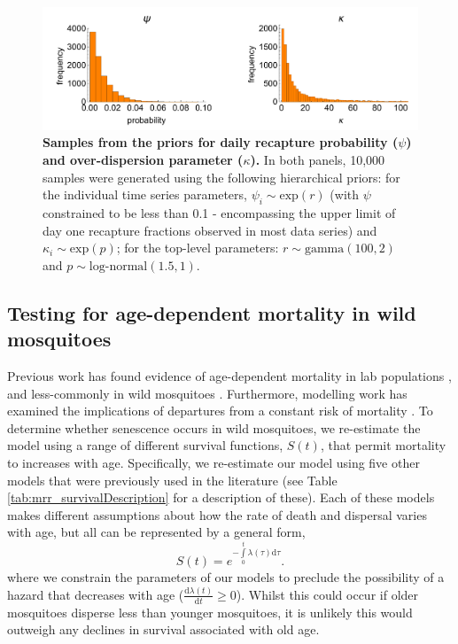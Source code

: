\documentclass[12pt]{article}
\begin{document}
\begin{figure}[h]
	\centerline{\includegraphics[width=1\textwidth]{./Figure_files/mrr_priors_PsiKappa.pdf}}
	\caption{\textbf{Samples from the priors for daily recapture probability ($\psi$) and over-dispersion parameter ($\kappa$).} In both panels, 10,000 samples were generated using the following hierarchical priors: for the individual time series parameters, $\psi_i \sim \text{exp}(r)$ (with $\psi$ constrained to be less than 0.1 - encompassing the upper limit of day one recapture fractions observed in most data series) and $\kappa_i \sim \text{exp}(p)$; for the top-level parameters: $r\sim \text{gamma}(100, 2)$ and $p\sim \text{log-normal}(1.5, 1)$.}\label{fig:mrr_PsiKappaPriors}
\end{figure}

\subsection{Testing for age-dependent mortality in wild mosquitoes}\label{sec:mrr_age_dependence}
Previous work has found evidence of age-dependent mortality in lab populations \citep{styer2007mosquitoes,dawes2009anopheles}, and less-commonly in wild mosquitoes \citep{clements1981analysis,harrington2008age}. Furthermore, modelling work has examined the implications of departures from a constant risk of mortality \citep{styer2007mosquitoes,hancock2009age,novoseltsev2012age}. To determine whether senescence occurs in wild mosquitoes, we re-estimate the model using a range of different survival functions, $S(t)$, that permit mortality to increases with age. Specifically, we re-estimate our model using five other models that were previously used in the literature (see Table \ref{tab:mrr_survivalDescription} for a description of these). Each of these models makes different assumptions about how the rate of death and dispersal varies with age, but all can be represented by a general form,
%
\begin{equation}\label{eq:survivalInt}
S(t) = e^{-\int\limits_{0}^{t}\lambda(\tau) \mathrm{d}\tau}.
\end{equation}
%
where we constrain the parameters of our models to preclude the possibility of a hazard that decreases with age ($\frac{\mathrm{d}\lambda(t)}{\mathrm{d}t} \geq 0$). Whilst this could occur if older mosquitoes disperse less than younger mosquitoes, it is unlikely this would outweigh any declines in survival associated with old age.
\end{document}
